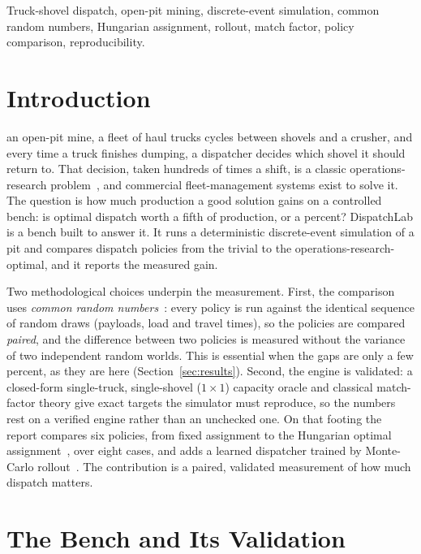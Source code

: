 \documentclass[journal]{IEEEtran}
\begin{document}
\begin{IEEEkeywords}
Truck-shovel dispatch, open-pit mining, discrete-event simulation, common random numbers, Hungarian assignment,
rollout, match factor, policy comparison, reproducibility.
\end{IEEEkeywords}

\section{Introduction}

 an open-pit mine, a fleet of haul trucks cycles between shovels and a crusher, and every time
a truck finishes dumping, a dispatcher decides which shovel it should return to. That decision, taken hundreds of
times a shift, is a classic operations-research problem~\cite{newman,alarie}, and commercial fleet-management
systems exist to solve it. The question is how much production a good solution gains on a controlled bench: is
optimal dispatch worth a fifth of production, or a percent? DispatchLab is a bench built to answer it. It runs a deterministic discrete-event simulation of a pit
and compares dispatch policies from the trivial to the operations-research-optimal, and it reports the measured
gain.

Two methodological choices underpin the measurement. First, the comparison uses \emph{common random
numbers}~\cite{glasserman}: every policy is run against the identical sequence of random draws (payloads, load and
travel times), so the policies are compared \emph{paired}, and the difference between two policies is measured
without the variance of two independent random worlds. This is essential when the gaps are only a few percent,
as they are here (Section~\ref{sec:results}). Second, the engine is validated: a closed-form single-truck,
single-shovel ($1\times1$) capacity oracle and classical match-factor theory give exact targets the simulator
must reproduce, so the numbers rest on a verified engine rather than an unchecked one. On that footing the report
compares six policies, from fixed assignment to the Hungarian optimal assignment~\cite{kuhn}, over eight cases,
and adds a learned dispatcher trained by Monte-Carlo rollout~\cite{bertsekas}. The contribution is a paired,
validated measurement of how much dispatch matters.

\section{The Bench and Its Validation}\label{sec:bench}
\end{document}
